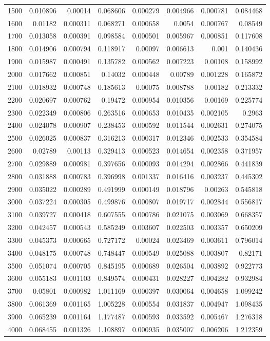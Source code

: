 \begin{longtable}{r r r r r r r r}
1500 & 0.010896 & 0.00014 & 0.068606 & 0.000279 & 0.004966 & 0.000781 & 0.084468 \\
1600 & 0.01182 & 0.000311 & 0.068271 & 0.000658 & 0.0054 & 0.000767 & 0.08549 \\
1700 & 0.013058 & 0.000391 & 0.098584 & 0.000501 & 0.005967 & 0.000851 & 0.117608 \\
1800 & 0.014906 & 0.000794 & 0.118917 & 0.00097 & 0.006613 & 0.001 & 0.140436 \\
1900 & 0.015987 & 0.000491 & 0.135782 & 0.000562 & 0.007223 & 0.00108 & 0.158992 \\
2000 & 0.017662 & 0.000851 & 0.14032 & 0.000448 & 0.00789 & 0.001228 & 0.165872 \\
2100 & 0.018932 & 0.000748 & 0.185613 & 0.00075 & 0.008788 & 0.00182 & 0.213332 \\
2200 & 0.020697 & 0.000762 & 0.19472 & 0.000954 & 0.010356 & 0.00169 & 0.225774 \\
2300 & 0.022349 & 0.000806 & 0.263516 & 0.000653 & 0.010435 & 0.002105 & 0.2963 \\
2400 & 0.024078 & 0.000907 & 0.238453 & 0.000592 & 0.011544 & 0.002631 & 0.274075 \\
2500 & 0.026025 & 0.000837 & 0.316213 & 0.000317 & 0.012346 & 0.002533 & 0.354584 \\
2600 & 0.02789 & 0.00113 & 0.329413 & 0.000523 & 0.014654 & 0.002358 & 0.371957 \\
2700 & 0.029889 & 0.000981 & 0.397656 & 0.000093 & 0.014294 & 0.002866 & 0.441839 \\
2800 & 0.031888 & 0.000783 & 0.396998 & 0.001337 & 0.016416 & 0.003237 & 0.445302 \\
2900 & 0.035022 & 0.000289 & 0.491999 & 0.000149 & 0.018796 & 0.00263 & 0.545818 \\
3000 & 0.037224 & 0.000305 & 0.499876 & 0.000807 & 0.019717 & 0.002844 & 0.556817 \\
3100 & 0.039727 & 0.000418 & 0.607555 & 0.000786 & 0.021075 & 0.003069 & 0.668357 \\
3200 & 0.042457 & 0.000543 & 0.585249 & 0.003607 & 0.022503 & 0.003357 & 0.650209 \\
3300 & 0.045373 & 0.000665 & 0.727172 & 0.00024 & 0.023469 & 0.003611 & 0.796014 \\
3400 & 0.048175 & 0.000748 & 0.748447 & 0.000549 & 0.025088 & 0.003807 & 0.82171 \\
3500 & 0.051074 & 0.000705 & 0.845195 & 0.000689 & 0.026504 & 0.003892 & 0.922773 \\
3600 & 0.055183 & 0.001103 & 0.849574 & 0.000431 & 0.028227 & 0.004282 & 0.932984 \\
3700 & 0.05801 & 0.000982 & 1.011169 & 0.000397 & 0.030064 & 0.004658 & 1.099242 \\
3800 & 0.061369 & 0.001165 & 1.005228 & 0.000554 & 0.031837 & 0.004947 & 1.098435 \\
3900 & 0.065239 & 0.001164 & 1.177487 & 0.000593 & 0.033592 & 0.005467 & 1.276318 \\
4000 & 0.068455 & 0.001326 & 1.108897 & 0.000935 & 0.035007 & 0.006206 & 1.212359 \\
\end{longtable}

